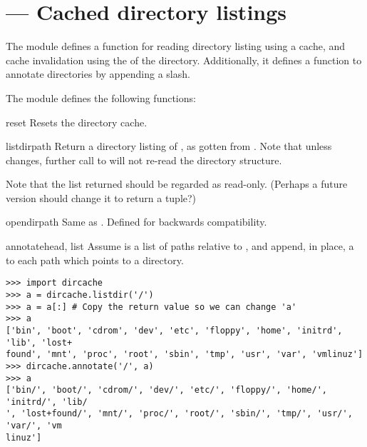 \section{ ---
         Cached directory listings}


The  module defines a function for reading directory listing
using a cache, and cache invalidation using the  of the directory.
Additionally, it defines a function to annotate directories by appending
a slash.

The  module defines the following functions:

\begin{funcdesc}{reset}{}
Resets the directory cache.
\end{funcdesc}

\begin{funcdesc}{listdir}{path}
Return a directory listing of , as gotten from
. Note that unless  changes, further call
to  will not re-read the directory structure.

Note that the list returned should be regarded as read-only. (Perhaps
a future version should change it to return a tuple?)
\end{funcdesc}

\begin{funcdesc}{opendir}{path}
Same as . Defined for backwards compatibility.
\end{funcdesc}

\begin{funcdesc}{annotate}{head, list}
Assume  is a list of paths relative to , and append,
in place, a \character{/} to each path which points to a directory.
\end{funcdesc}

\begin{verbatim}
>>> import dircache
>>> a = dircache.listdir('/')
>>> a = a[:] # Copy the return value so we can change 'a'
>>> a
['bin', 'boot', 'cdrom', 'dev', 'etc', 'floppy', 'home', 'initrd', 'lib', 'lost+
found', 'mnt', 'proc', 'root', 'sbin', 'tmp', 'usr', 'var', 'vmlinuz']
>>> dircache.annotate('/', a)
>>> a
['bin/', 'boot/', 'cdrom/', 'dev/', 'etc/', 'floppy/', 'home/', 'initrd/', 'lib/
', 'lost+found/', 'mnt/', 'proc/', 'root/', 'sbin/', 'tmp/', 'usr/', 'var/', 'vm
linuz']
\end{verbatim}

